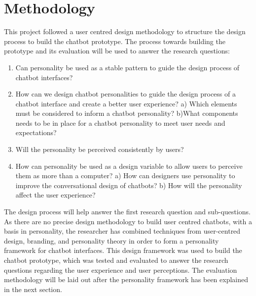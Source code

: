 \chapter{Methodology}
\label{chap:methodology}

This project followed a user centred design methodology to structure the design process to build the chatbot prototype. The process towards building the prototype and its evaluation will be used to answer the research questions:

\begin{enumerate}
    \item Can personality be used as a stable pattern to guide the design process of chatbot interfaces?
    \item How can we design chatbot personalities to guide the design process of a chatbot interface and create a better user experience? 
        \subitem a) Which elements must be considered to inform a chatbot personality?
        \subitem b)What components needs to be in place for a chatbot personality to meet user needs and expectations?
    \item Will the personality be perceived consistently by users?
    \item How can personality be used as a design variable to allow users to perceive them as more than a computer?
        \subitem a) How can designers use personality to improve the conversational design of chatbots? %
        \subitem b) How will the personality affect the user experience? %
\end{enumerate}

The design process will help answer the first research question and sub-questions. As there are no precise design methodology to build user centred chatbots, with a basis in personality, the researcher has combined techniques from user-centred design, branding, and personality theory in order to form a personality framework for chatbot interfaces. This design framework was used to build the chatbot prototype, which was tested and evaluated to answer the research questions regarding the user experience and user perceptions. The evaluation methodology will be laid out after the personality framework has been explained in the next section.

\vspace{5mm} %

